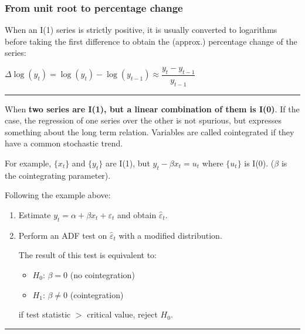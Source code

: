 \begin{f}
\subsubsection*{From unit root to percentage change}

When an I(1) series is strictly positive, it is usually converted to logarithms before taking the first difference to obtain the (approx.) percentage change of the series:

\begin{center}
	\(\Delta \log(y_{t}) = \log(y_{t}) - \log(y_{t - 1}) \approx \dfrac{y_t - y_{t - 1}} {y_{t - 1}}\)
\end{center}

		\end{f}  \hrule

  \begin{f}[Cointegration]

When \textbf{two series are I(1), but a linear combination of them is I(0)}. If the case, the regression of one series over the other is not spurious, but expresses something about the long term relation. Variables are called cointegrated if they have a common stochastic trend.

For example, \(\lbrace x_{t} \rbrace\) and \(\lbrace y_{t} \rbrace\) are I(1), but \(y_{t} - \beta x_{t} = u_{t}\) where \(\lbrace u_{t} \rbrace\) is I(0). (\(\beta\) is the cointegrating parameter).

\end{f}  

\begin{f}

Following the example above:

\begin{enumerate}[leftmargin=*]
	\item Estimate \(y_{t} = \alpha + \beta x_{t} + \varepsilon_{t}\) and obtain \(\hat{\varepsilon}_{t}\).
	\item Perform an ADF test on \(\hat{\varepsilon}_{t}\) with a modified distribution.
	
	The result of this test is equivalent to:
	
	\begin{itemize}[leftmargin=*]
		\item \(H_{0}\): \(\beta = 0\) (no cointegration)
		\item \(H_{1}\): \(\beta \neq 0\) (cointegration)
	\end{itemize}
	
	if test statistic \(>\) critical value, reject \(H_0\).
\end{enumerate}

\end{f}  \hrule

